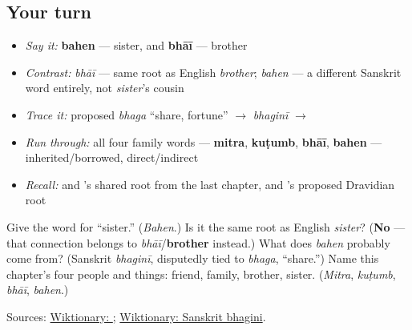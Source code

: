 \subsection*{Your turn}
\begin{itemize}
\raggedright
  \item \emph{Say it:} \textbf{bahen} — sister, and \textbf{bhāī} — brother
  \item \emph{Contrast:} \emph{bhāī} — same root as English \emph{brother}; \emph{bahen} — a different Sanskrit word entirely, not \emph{sister}'s cousin
  \item \emph{Trace it:} proposed \emph{bhaga} \textquotedblleft{}share, fortune\textquotedblright{} $\to$ \emph{bhaginī} $\to$ \textbf{}
  \item \emph{Run through:} all four family words — \textbf{mitra}, \textbf{kuṭumb}, \textbf{bhāī}, \textbf{bahen} — inherited/borrowed, direct/indirect
  \item \emph{Recall:} \textbf{} and \textbf{}'s shared root from the last chapter, and \textbf{}'s proposed Dravidian root
\end{itemize}

\begin{tcolorbox}[breakable,colback=teal!4,colframe=teal!35!black,title={Before you move on}]
Give the word for \textquotedblleft{}sister.\textquotedblright{} (\emph{Bahen}.) Is it the same root as English \emph{sister}? (\textbf{No} — that connection belongs to \emph{bhāī}/\textbf{brother} instead.) What does \emph{bahen} probably come from? (Sanskrit \emph{bhaginī}, disputedly tied to \emph{bhaga}, \textquotedblleft{}share.\textquotedblright{}) Name this chapter's four people and things: friend, family, brother, sister. (\emph{Mitra}, \emph{kuṭumb}, \emph{bhāī}, \emph{bahen}.)

Sources: \href{https://en.wiktionary.org/wiki/\%E0\%AA\%AC\%E0\%AA\%B9\%E0\%AB\%87\%E0\%AA\%A8}{Wiktionary: }; \href{https://en.wiktionary.org/wiki/\%E0\%A4\%AD\%E0\%A4\%97\%E0\%A4\%BF\%E0\%A4\%A8\%E0\%A5\%80}{Wiktionary: Sanskrit bhagini}.
\end{tcolorbox}
